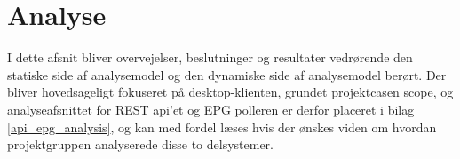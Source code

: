 \section{Analyse}
I dette afsnit bliver overvejelser, beslutninger og resultater vedrørende den statiske side af analysemodel og den dynamiske side af analysemodel berørt. Der bliver hovedsageligt fokuseret på desktop-klienten, grundet projektcasen scope, og analyseafsnittet for REST api'et og EPG polleren er derfor placeret i bilag \ref{api_epg_analysis}, og kan med fordel læses hvis der ønskes viden om hvordan projektgruppen analyserede disse to delsystemer. 


\newpage


\newpage